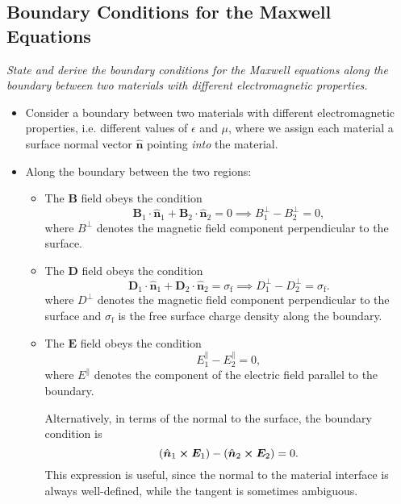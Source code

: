 \documentclass[11pt, a4paper]{article}
\renewcommand{\vec}[1]{\bm{#1}} %
\newcommand{\uvec}[1]{\hat{\vec{#1}}} %
\newcommand{\E}{\vec{E}} %
\newcommand{\D}{\vec{D}}  %
\newcommand{\B}{\vec{B}} %
\begin{document}
\subsection{Boundary Conditions for the Maxwell Equations}
\textit{State and derive the boundary conditions for the Maxwell equations along the boundary between two materials with different electromagnetic properties.}
    
\begin{itemize}

    \item Consider a boundary between two materials with different electromagnetic properties, i.e. different values of $ \epsilon $ and $ \mu $, where we assign each material a surface normal vector $ \uvec{n} $ pointing \textit{into} the material. 


    \item Along the boundary between the two regions:
    \begin{itemize}

        \item The $ \B $ field obeys the condition
        \begin{equation*}
            \B_{1} \cdot \uvec{n}_{1} + \B_{2} \cdot \uvec{n}_{2} = 0 \implies B_{1}^{\perp} - B_{2}^{\perp} = 0,
        \end{equation*}
        where $ B^{\perp} $ denotes the magnetic field component perpendicular to the surface.
        
        \item The $ \D $ field obeys the condition
            \begin{equation*}
                \D_{1} \cdot \uvec{n}_{1} + \D_{2} \cdot \uvec{n}_{2} = \sigma_{\text{f}} \implies D_{1}^{\perp} - D_{2}^{\perp} = \sigma_{\text{f}}.
	\end{equation*}
        where $ D^{\perp} $ denotes the magnetic field component perpendicular to the surface and $ \sigma_{\text{f}} $ is the free surface charge density along the boundary.

        \item The $ \E $ field obeys the condition
        \begin{equation*}
            E_{1}^{\parallel} - E_{2}^{\parallel} = 0,
        \end{equation*}
        where $ E^{\parallel} $ denotes the component of the electric field parallel to the boundary.

        Alternatively, in terms of the normal to the surface, the boundary condition is
        \begin{equation*}
            (\uvec{n}_{1} \cross \E_{1}) - (\uvec{n}_{2}\cross \E_{2}) = 0.
        \end{equation*}
        This expression is useful, since the normal to the material interface is always well-defined, while the tangent is sometimes ambiguous.
    

\end{itemize}
\end{itemize}
\end{document}
